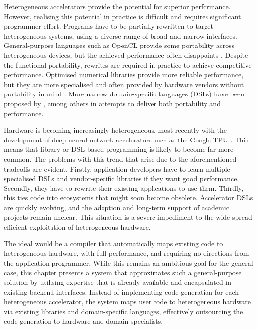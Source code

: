     Heterogeneous accelerators provide the potential for superior performance.
    However, realising this potential in practice is difficult and requires
    significant programmer effort.
    Programs have to be partially rewritten to target heterogeneous systems,
    using a diverse range of broad and narrow interfaces.
    General-purpose languages such as OpenCL \citep{nvidia11guide} provide
    some portability across heterogeneous devices, but the achieved performance
    often disappoints \citep{lee09openmp}.
    Despite the functional portability, rewrites are required in practice to
    achieve competitive performance.
    Optimised numerical libraries provide more reliable performance, but they
    are more specialised and often provided by hardware vendors without
    portability in mind \citep{clblas,cublas,cusparse,clsparse}.
    More narrow domain-specific languages (DSLs) have been proposed by
    \citet{Ragan-Kelley2013Halide,
           Franchetti09OL,
           Rompf:2012:LMS:2184319.2184345}, among others in attempts to deliver
    both portability and performance.

    Hardware is becoming increasingly heterogeneous, most recently with the
    development of deep neural network accelerators such as the Google TPU
    \citep{jouppi2017datacenter}.
    This means that library or DSL based programming is likely to become far
    more common.
    The problems with this trend that arise due to the aforementioned tradeoffs
    are evident.
    Firstly, application developers have to learn multiple specialised DSLs and
    vendor-specific libraries if they want good performance.
    Secondly, they have to rewrite their existing applications to use them.
    Thirdly, this ties code into ecosystems that might soon become obsolete.
    Accelerator DSLs are quickly evolving, and the adoption and long-term
    support of academic projects remain unclear.
    This situation is a severe impediment to the wide-spread efficient
    exploitation of heterogeneous hardware.

    The ideal would be a compiler that automatically maps existing code to
    heterogeneous hardware, with full performance, and requiring no directions
    from the application programmer.
    While this remains an ambitious goal for the general case, this chapter
    presents a system that approximates such a general-purpose solution by
    utilising expertise that is already available and encapsulated in existing
    backend interfaces.
    Instead of implementing code generation for each heterogeneous
    accelerator, the system maps user code to heterogeneous hardware via
    existing libraries and domain-specific languages, effectively outsourcing
    the code generation to hardware and domain specialists.

